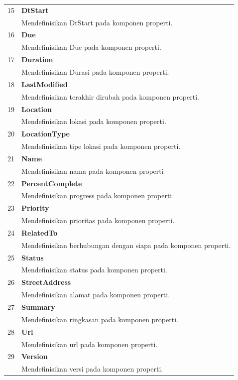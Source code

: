 \begin{tabular}{|c|p{12cm}|}
		15 & \textbf{DtStart}\\
			&	Mendefinisikan DtStart pada komponen properti.\\ \hline
		16 & \textbf{Due}\\
			&	Mendefinisikan Due pada komponen properti.\\ \hline
		17 & \textbf{Duration}\\
			&	Mendefinisikan Durasi pada komponen properti.\\ \hline
		18 & \textbf{LastModified}\\
			&	Mendefinisikan terakhir dirubah pada komponen properti.\\ \hline
		19 & \textbf{Location}\\
			&	Mendefinisikan lokasi pada komponen properti.\\ \hline
		20 & \textbf{LocationType}\\
			&	Mendefinisikan tipe lokasi pada komponen properti.\\ \hline
		21 & \textbf{Name}\\
			&	Mendefinisikan nama pada komponen properti\\ \hline
		22 & \textbf{PercentComplete}\\
			&	Mendefinisikan progress pada komponen properti.\\ \hline
		23 & \textbf{Priority}\\
			&	Mendefinisikan prioritas pada komponen properti.\\ \hline
		24 & \textbf{RelatedTo}\\
			&	Mendefinisikan berhubungan dengan siapa pada komponen properti.\\ \hline
		25 & \textbf{Status}\\
			&	Mendefinisikan status pada komponen properti.\\ \hline
		26 & \textbf{StreetAddress}\\
			&	Mendefinisikan alamat pada komponen properti.\\ \hline
		27 & \textbf{Summary}\\
			&	Mendefinisikan ringkasan pada komponen properti.\\ \hline
		28 & \textbf{Url}\\
			&	Mendefinisikan url pada komponen properti.\\ \hline
		29 & \textbf{Version}\\
			&	Mendefinisikan versi pada komponen properti.\\ \hline	
	\end{tabular}

